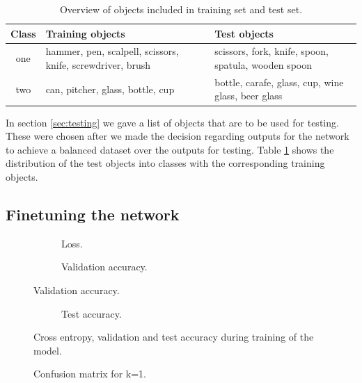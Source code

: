 \begin{table}
	\begin{tabular}{|c|p{5cm}|p{5cm}|}
		\hline
		Class & Training objects & Test objects \\
		\hline
		one & hammer, pen, scalpell, scissors, knife, screwdriver, brush & scissors, fork, knife, spoon, spatula, wooden spoon \\
		\hline
		two & can, pitcher, glass, bottle, cup & bottle, carafe, glass, cup, wine glass, beer glass \\
		\hline
	\end{tabular}
	\caption{Overview of objects included in training set and test set.}
	\label{tab:classification_objects}
\end{table}

In section \ref{sec:testing} we gave a list of objects that are to be used for testing. These were chosen after we made the decision regarding outputs for the network to achieve a balanced dataset over the outputs for testing. Table \ref{tab:classification_objects} shows the distribution of the test objects into classes with the corresponding training objects.


\subsection{Finetuning the network}

\begin{figure}
	\centering
	\begin{subfigure}[b]{\textwidth}
		
		\caption{Loss.}
		\label{fig:results_plots_loss}
	\end{subfigure}
	\begin{subfigure}[b]{\textwidth}
		
		\caption{Validation accuracy.}
		\label{fig:results_plots_val}
	\end{subfigure}
\end{figure}
\begin{figure}
	\ContinuedFloat
	\begin{subfigure}[b]{\textwidth}
		
		\caption{Test accuracy.}
		\label{fig:results_plots_test}
	\end{subfigure}
	\label{fig:results_plots}
	\caption{Cross entropy, validation and test accuracy during training of the model.}
\end{figure}

\begin{figure}
	
	\caption{Confusion matrix for k=1.}
	\label{fig:confusion_matrix}
\end{figure}

